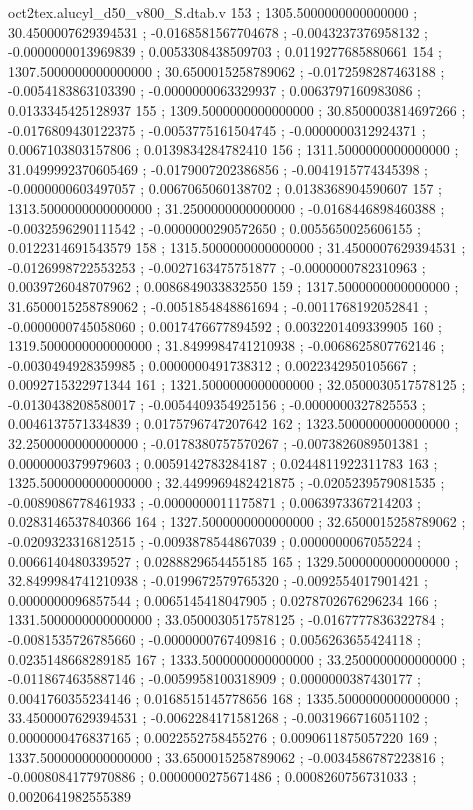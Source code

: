 \begin{filecontents}[overwrite]{oct2tex.alucyl_d50_v800_S.dtab.v}
153 ; 1305.5000000000000000 ; 30.4500007629394531 ; -0.0168581567704678 ; -0.0043237376958132 ; -0.0000000013969839 ; 0.0053308438509703 ; 0.0119277685880661
154 ; 1307.5000000000000000 ; 30.6500015258789062 ; -0.0172598287463188 ; -0.0054183863103390 ; -0.0000000063329937 ; 0.0063797160983086 ; 0.0133345425128937
155 ; 1309.5000000000000000 ; 30.8500003814697266 ; -0.0176809430122375 ; -0.0053775161504745 ; -0.0000000312924371 ; 0.0067103803157806 ; 0.0139834284782410
156 ; 1311.5000000000000000 ; 31.0499992370605469 ; -0.0179007202386856 ; -0.0041915774345398 ; -0.0000000603497057 ; 0.0067065060138702 ; 0.0138368904590607
157 ; 1313.5000000000000000 ; 31.2500000000000000 ; -0.0168446898460388 ; -0.0032596290111542 ; -0.0000000290572650 ; 0.0055650025606155 ; 0.0122314691543579
158 ; 1315.5000000000000000 ; 31.4500007629394531 ; -0.0126998722553253 ; -0.0027163475751877 ; -0.0000000782310963 ; 0.0039726048707962 ; 0.0086849033832550
159 ; 1317.5000000000000000 ; 31.6500015258789062 ; -0.0051854848861694 ; -0.0011768192052841 ; -0.0000000745058060 ; 0.0017476677894592 ; 0.0032201409339905
160 ; 1319.5000000000000000 ; 31.8499984741210938 ; -0.0068625807762146 ; -0.0030494928359985 ; 0.0000000491738312 ; 0.0022342950105667 ; 0.0092715322971344
161 ; 1321.5000000000000000 ; 32.0500030517578125 ; -0.0130438208580017 ; -0.0054409354925156 ; -0.0000000327825553 ; 0.0046137571334839 ; 0.0175796747207642
162 ; 1323.5000000000000000 ; 32.2500000000000000 ; -0.0178380757570267 ; -0.0073826089501381 ; 0.0000000379979603 ; 0.0059142783284187 ; 0.0244811922311783
163 ; 1325.5000000000000000 ; 32.4499969482421875 ; -0.0205239579081535 ; -0.0089086778461933 ; -0.0000000011175871 ; 0.0063973367214203 ; 0.0283146537840366
164 ; 1327.5000000000000000 ; 32.6500015258789062 ; -0.0209323316812515 ; -0.0093878544867039 ; 0.0000000067055224 ; 0.0066140480339527 ; 0.0288829654455185
165 ; 1329.5000000000000000 ; 32.8499984741210938 ; -0.0199672579765320 ; -0.0092554017901421 ; 0.0000000096857544 ; 0.0065145418047905 ; 0.0278702676296234
166 ; 1331.5000000000000000 ; 33.0500030517578125 ; -0.0167777836322784 ; -0.0081535726785660 ; -0.0000000767409816 ; 0.0056263655424118 ; 0.0235148668289185
167 ; 1333.5000000000000000 ; 33.2500000000000000 ; -0.0118674635887146 ; -0.0059958100318909 ; 0.0000000387430177 ; 0.0041760355234146 ; 0.0168515145778656
168 ; 1335.5000000000000000 ; 33.4500007629394531 ; -0.0062284171581268 ; -0.0031966716051102 ; 0.0000000476837165 ; 0.0022552758455276 ; 0.0090611875057220
169 ; 1337.5000000000000000 ; 33.6500015258789062 ; -0.0034586787223816 ; -0.0008084177970886 ; 0.0000000275671486 ; 0.0008260756731033 ; 0.0020641982555389

\end{filecontents}
